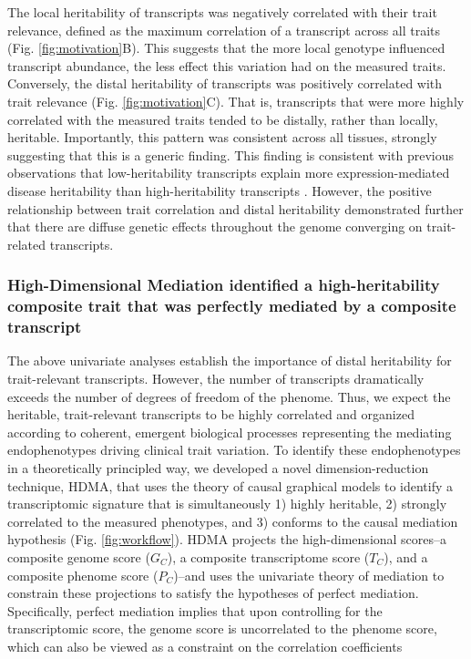 \documentclass[
]{article}
\begin{document}
The local heritability of transcripts was negatively correlated with
their trait relevance, defined as the maximum correlation of a
transcript across all traits (Fig. \ref{fig:motivation}B). This suggests
that the more local genotype influenced transcript abundance, the less
effect this variation had on the measured traits. Conversely, the distal
heritability of transcripts was positively correlated with trait
relevance (Fig. \ref{fig:motivation}C). That is, transcripts that were
more highly correlated with the measured traits tended to be distally,
rather than locally, heritable. Importantly, this pattern was consistent
across all tissues, strongly suggesting that this is a generic finding.
This finding is consistent with previous observations that
low-heritability transcripts explain more expression-mediated disease
heritability than high-heritability transcripts \cite{pmid32424349}.
However, the positive relationship between trait correlation and distal
heritability demonstrated further that there are diffuse genetic effects
throughout the genome converging on trait-related transcripts.

\subsubsection{High-Dimensional Mediation identified a high-heritability
composite trait that was perfectly mediated by a composite
transcript}\label{high-dimensional-mediation-identified-a-high-heritability-composite-trait-that-was-perfectly-mediated-by-a-composite-transcript}

The above univariate analyses establish the importance of distal
heritability for trait-relevant transcripts. However, the number of
transcripts dramatically exceeds the number of degrees of freedom of the
phenome. Thus, we expect the heritable, trait-relevant transcripts to be
highly correlated and organized according to coherent, emergent
biological processes representing the mediating endophenotypes driving
clinical trait variation. To identify these endophenotypes in a
theoretically principled way, we developed a novel dimension-reduction
technique, HDMA, that uses the theory of causal graphical models to
identify a transcriptomic signature that is simultaneously 1) highly
heritable, 2) strongly correlated to the measured phenotypes, and 3)
conforms to the causal mediation hypothesis (Fig. \ref{fig:workflow}).
HDMA projects the high-dimensional scores--a composite genome score
(\(G_C\)), a composite transcriptome score (\(T_C\)), and a composite
phenome score (\(P_C\))--and uses the univariate theory of mediation to
constrain these projections to satisfy the hypotheses of perfect
mediation. Specifically, perfect mediation implies that upon controlling
for the transcriptomic score, the genome score is uncorrelated to the
phenome score, which can also be viewed as a constraint on the
correlation coefficients
\end{document}
